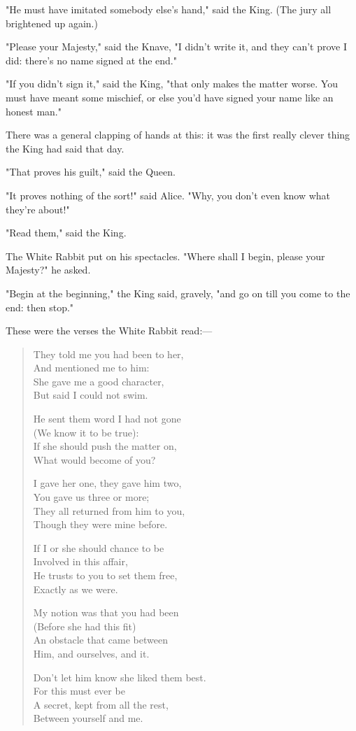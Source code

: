 "He must have imitated somebody else's hand," said the King. (The jury all brightened up again.)

​"Please your Majesty," said the Knave, "I didn't write it, and they can't prove I did: there's no name signed at the end."

"If you didn't sign it," said the King, "that only makes the matter worse. You must have meant some mischief, or else you'd have signed your name like an honest man."

There was a general clapping of hands at this: it was the first really clever thing the King had said that day.

"That proves his guilt," said the Queen.

"It proves nothing of the sort!" said Alice. "Why, you don't even know what they're about!"

"Read them," said the King.

The White Rabbit put on his spectacles. "Where shall I begin, please your Majesty?" he asked.

"Begin at the beginning," the King said, gravely, "and go on till you come to the end: then stop."

These were the verses the White Rabbit read:—

\begin{quote}
They told me you had been to her,\\
⁠And mentioned me to him:\\
She gave me a good character,\\
⁠But said I could not swim.

He sent them word I had not gone\\
⁠(We know it to be true):\\
If she should push the matter on,\\
⁠What would become of you?

I gave her one, they gave him two,\\
⁠You gave us three or more;\\
They all returned from him to you,\\
⁠Though they were mine before.

If I or she should chance to be\\
⁠Involved in this affair,\\
He trusts to you to set them free,\\
⁠Exactly as we were.

My notion was that you had been\\
⁠(Before she had this fit)\\
An obstacle that came between\\
⁠Him, and ourselves, and it.

Don't let him know she liked them best.\\
⁠For this must ever be\\
A secret, kept from all the rest,\\
⁠Between yourself and me.
\end{quote}

